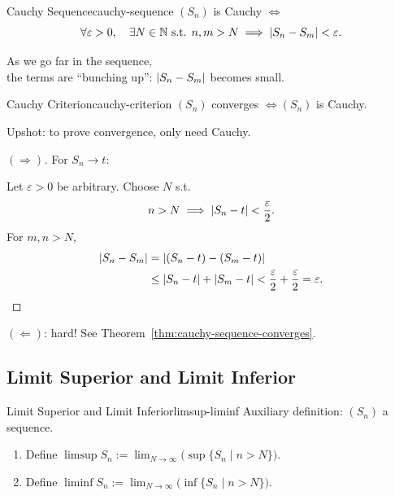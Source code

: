 \begin{definition}{Cauchy Sequence}{cauchy-sequence}
  $(S_n)$ is Cauchy $\iff$
  \[
    \forall\varepsilon>0,\quad\exists N\in\mathbb{N}\text{ s.t. }
    n,m>N\implies\left\lvert S_n-S_m \right\rvert<\varepsilon.
  \]
\end{definition}

\begin{thinking}[Intuition]
  As we go far in the sequence,\\
  the terms are ``bunching up'': $\left\lvert S_n-S_m \right\rvert$ becomes small.
\end{thinking}

\begin{theorem}{Cauchy Criterion}{cauchy-criterion}
  $(S_n)$ converges $\iff(S_n)$ is Cauchy.
\end{theorem}

Upshot: to prove convergence, only need Cauchy.

\begin{proof}[$(\Rightarrow)$]
  For $S_n\to t$:

  Let $\varepsilon>0$ be arbitrary. Choose $N$ s.t.
  \[
    n>N\implies\left\lvert S_n-t \right\rvert<\frac\varepsilon2.
  \]
  For $m,n>N$,
  \begin{align*}
    \left\lvert S_n-S_m \right\rvert & =\left\lvert (S_n-t)-(S_m-t) \right\rvert     \\
                  & \le\left\lvert S_n-t \right\rvert+\left\lvert S_m-t \right\rvert
    <\frac\varepsilon2+\frac\varepsilon2=\varepsilon.\qedhere
  \end{align*}
\end{proof}

$(\Leftarrow)$: hard! See Theorem~\ref{thm:cauchy-sequence-converges}.

\subsection{Limit Superior and Limit Inferior}

\begin{definition}{Limit Superior and Limit Inferior}{limsup-liminf}
  Auxiliary definition: $(S_n)$ a sequence.
  \begin{enumerate}[label=(\roman*)]
    \item Define $\displaystyle\limsup S_n:=\lim_{N\to\infty}\bigl(\sup\{S_n\mid n>N\}\bigr)$.
    \item Define $\displaystyle\liminf S_n:=\lim_{N\to\infty}\bigl(\inf\{S_n\mid n>N\}\bigr)$.
  \end{enumerate}
\end{definition}

